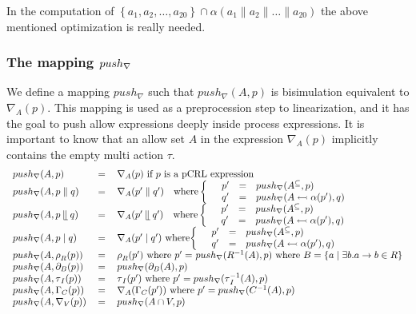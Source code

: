 \documentclass{article}
\begin{document}
In the computation of $\left\{ a_{1},a_{2},\ldots ,a_{20}\right\} \cap
\alpha \left( a_{1}\parallel a_{2}\parallel \ldots \parallel a_{20}\right) $
the above mentioned optimization is really needed.

\subsubsection{The mapping $push_{\protect\nabla }$}

We define a mapping $push_{\nabla }$ such that $push_{\nabla }(A,p)$ is
bisimulation equivalent to $\nabla _{A}(p)$. This mapping is used as a
preprocession step to linearization, and it has the goal to push allow
expressions deeply inside process expressions. It is important to know that
an allow set $A$ in the expression $\nabla _{A}(p)$ implicitly contains the
empty multi action $\tau $.%
\[
\begin{tabular}{lll}
$push_{\nabla }(A,p)$ & $=$ & $\nabla _{A}(p)$ if $p$ is a pCRL expression
\\ 
$push_{\nabla }(A,p\parallel q)$ & $=$ & $\nabla _{A}(p^{\prime }\parallel
q^{\prime })\text{ where}\left\{ \text{ }%
\begin{array}{lll}
p^{\prime } & = & push_{\nabla }(A^{\subseteq },p) \\ 
q^{\prime } & = & push_{\nabla }(A\leftarrowtail \alpha (p^{\prime }),q)%
\end{array}%
\right. $ \\ 
$push_{\nabla }(A,p\mathbin{\mathrel{\llfloor}}q)$ & $=$ & $\nabla
_{A}(p^{\prime }\mathbin{\mathrel{\llfloor}}q^{\prime })\text{ where}\left\{ 
\text{ }%
\begin{array}{lll}
p^{\prime } & = & push_{\nabla }(A^{\subseteq },p) \\ 
q^{\prime } & = & push_{\nabla }(A\leftarrowtail \alpha (p^{\prime }),q)%
\end{array}%
\right. $ \\ 
$push_{\nabla }(A,p\mid q)$ & $=$ & $\nabla _{A}(p^{\prime }\mid q^{\prime
}) $ where$\left\{ \text{ }%
\begin{array}{lll}
p^{\prime } & = & push_{\nabla }(A^{\subseteq },p) \\ 
q^{\prime } & = & push_{\nabla }(A\leftarrowtail \alpha (p^{\prime }),q)%
\end{array}%
\right. $ \\ 
$push_{\nabla }(A,\rho _{R}(p))$ & $=$ & $\rho _{R}(p^{\prime })$ where $%
p^{\prime }=$ $push_{\nabla }(R^{-1}(A),p)$ where $B=\{a\mid \exists
b.a\rightarrow b\in R\}$ \\ 
$push_{\nabla }(A,\partial _{B}(p))$ & $=$ & $push_{\nabla }(\partial
_{B}(A),p)$ \\ 
$push_{\nabla }(A,\tau _{I}(p))$ & $=$ & $\tau _{I}(p^{\prime })$ where $%
p^{\prime }=push_{\nabla }(\tau _{I}^{-1}(A),p)$ \\ 
$push_{\nabla }(A,\Gamma _{C}(p))$ & $=$ & $\nabla _{A}(\Gamma
_{C}(p^{\prime }))$ where $p^{\prime }=push_{\nabla }(C^{-1}(A),p)$ \\ 
$push_{\nabla }(A,\nabla _{V}(p))$ & $=$ & $push_{\nabla }(A\cap V,p)$%
\end{tabular}%
\]
\end{document}
